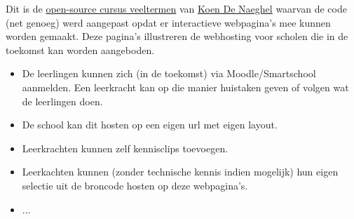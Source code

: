 \documentclass{ximera}
\begin{document}
Dit is de \href{https://www.koendenaeghel.be/opensource.htm}{open-source cursus veeltermen} van \href{https://www.koendenaeghel.be/}{Koen De Naeghel} waarvan de code (net genoeg) werd aangepast opdat er interactieve webpagina's mee kunnen worden gemaakt. Deze pagina's illustreren de webhosting voor scholen die in de toekomst kan worden aangeboden. 

\begin{itemize}
    \item De leerlingen kunnen zich (in de toekomst) via Moodle/Smartschool aanmelden. Een leerkracht kan op die manier huistaken geven of volgen wat de leerlingen doen. 
    \item De school kan dit hosten op een eigen url met eigen layout. 
    \item Leerkrachten kunnen zelf kennisclips toevoegen. 
    \item Leerkachten kunnen (zonder technische kennis indien mogelijk) hun eigen selectie uit de broncode hosten op deze webpagina's.
    \item ...
\end{itemize}
\end{document}
